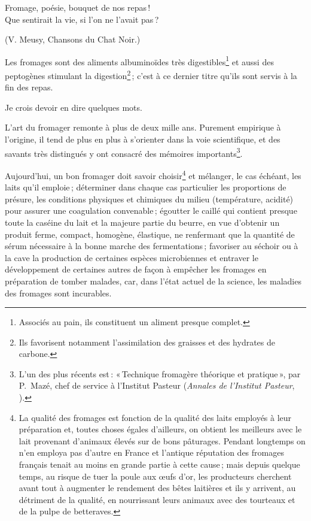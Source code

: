 \setlength{\epigraphwidth}{.5\textwidth}
\setlength{\epigraphrule}{0\textwidth}
\renewcommand{\epigraphsize}{\footnotesize}
\epigraph{Fromage, poésie, bouquet de nos repas !         \\
          Que sentirait la vie, si l'on ne l'avait pas ?}
          {(V. Meusy, Chansons du Chat Noir.)}

Les fromages sont des aliments albuminoïdes très digestibles\footnote{Associés
au pain, ils constituent un aliment presque complet.} et aussi des peptogènes
stimulant la digestion\footnote{Ils favorisent notamment l'assimilation des
graisses et des hydrates de carbone.} ; c'est à ce dernier titre qu'ils sont
servis à la fin des repas.

Je crois devoir en dire quelques mots.

L'art du fromager remonte à plus de deux mille ans. Purement empirique
à l'origine, il tend de plus en plus à s'orienter dans la voie scientifique, et
des savants très distingués y ont consacré des mémoires
importants\footnote{L'un des plus récents est : « Technique fromagère théorique
et pratique », par P. Mazé, chef de service à l'Institut Pasteur
(\textit{Annales de l'Institut Pasteur}, {\mmm}).}.

Aujourd'hui, un bon fromager doit savoir choisir\footnote{La qualité des
fromages est fonction de la qualité des laits employés à leur préparation et,
toutes choses égales d'ailleurs, on obtient les meilleurs avec le lait
provenant d'animaux élevés sur de bons pâturages. Pendant longtemps on n'en
employa pas d'autre en France et l'antique réputation des fromages français
tenait au moins en grande partie à cette cause ; mais depuis quelque temps, au
risque de tuer la poule aux œufs d'or, les producteurs cherchent avant tout
à augmenter le rendement des bêtes laitières et ils y arrivent, au détriment de
la qualité, en nourrissant leurs animaux avec des tourteaux et de la pulpe de
betteraves.} et mélanger, le cas échéant, les laits qu'il emploie ; déterminer
dans chaque cas particulier les proportions de présure, les conditions
physiques et chimiques du milieu (température, acidité) pour assurer une
coagulation convenable ; égoutter le caillé qui contient presque toute la
caséine du lait et la majeure partie du beurre, en vue d'obtenir un produit
ferme, compact, homogène, élastique, ne renfermant que la quantité de sérum
nécessaire à la bonne marche des fermentations ; favoriser au séchoir ou à la
cave la production de certaines espèces microbiennes et entraver le
développement de certaines autres de façon à empêcher les fromages en
préparation de tomber malades, car, dans l’état actuel de la science, les
maladies des fromages sont incurables.

